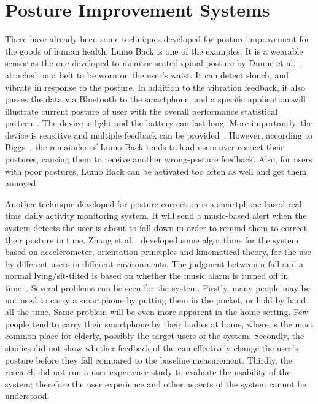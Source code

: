 \section{Posture Improvement Systems}
There have already been some techniques developed for posture improvement for the goods of human health. Lumo Back is one of the examples. It is a wearable sensor as the one developed to monitor seated spinal posture by Dunne et al.~\cite{wearable_spinal_posture}, attached on a belt to be worn on the user’s waist. It can detect slouch, and vibrate in response to the posture. In addition to the vibration feedback, it also passes the data via Bluetooth to the smartphone, and a specific application will illustrate current posture of user with the overall performance statistical pattern~\cite{review_lumo_posture_belt}. The device is light and the battery can last long. More importantly, the device is sensitive and multiple feedback can be provided~\cite{mindandmuscle_correct_posture}. However, according to Biggs~\cite{posture_saving_device}, the remainder of Lumo Back tends to lead users over-correct their postures, causing them to receive another wrong-posture feedback. Also, for users with poor postures, Lumo Back can be activated too often as well and get them annoyed.

Another technique developed for posture correction is a smartphone based real-time daily activity monitoring system. It will send a music-based alert when the system detects the user is about to fall down in order to remind them to correct their posture in time. Zhang et al.~\cite{smartphone_daily_activity_monitor} developed some algorithms for the system based on accelerometer, orientation principles and kinematical theory, for the use by different users in different environments. The judgment between a fall and a normal lying/sit-tilted is based on whether the music alarm is turned off in time~\cite{smartphone_daily_activity_monitor}. Several problems can be seen for the system. Firstly, many people may be not used to carry a smartphone by putting them in the pocket, or hold by hand all the time. Same problem will be even more apparent in the home setting. Few people tend to carry their smartphone by their bodies at home, where is the most common place for elderly, possibly the target users of the system. Secondly, the studies did not show whether feedback of the can effectively change the user's posture before they fall compared to the baseline measurement. Thirdly, the research did not run a user experience study to evaluate the usability of the system; therefore the user experience and other aspects of the system cannot be understood.

